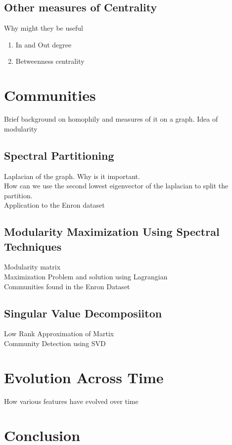\documentclass[12pt]{article}
\begin{document}
	\subsection{Other measures of Centrality} Why might they be useful
	\begin{enumerate}
	\item In and Out degree
	\item Betweenness centrality
	\end{enumerate}

\section{Communities} Brief background on homophily and measures of it on a graph. Idea of modularity
	\subsection{Spectral Partitioning} 
		Laplacian of the graph. Why is it important.  \\
		How can we use the second lowest eigenvector of the laplacian to split the partition. \\
		Application to the Enron dataset \\
	\subsection{Modularity Maximization Using Spectral Techniques} 
		Modularity matrix \\
		Maximization Problem and solution using Lagrangian \\
		Communities found in the Enron Dataset 
	\subsection{Singular Value Decomposiiton}
		Low Rank Approximation of Martix \\
		Community Detection using SVD \\

\section{Evolution Across Time} How various  features have evolved over time

\section{Conclusion}
\end{document}

